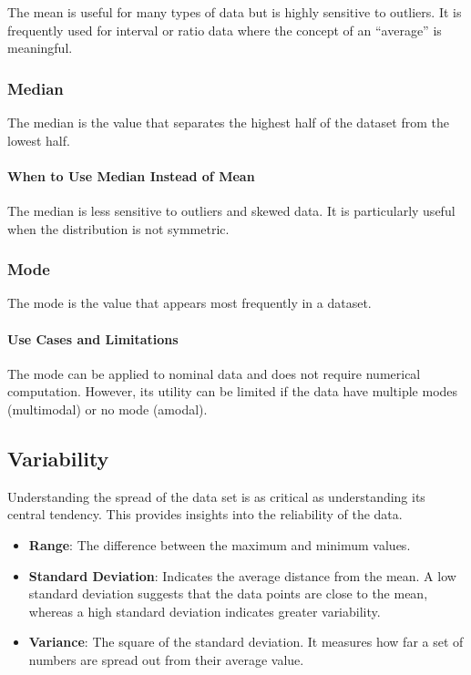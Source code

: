 \documentclass[
  b5paper]{book}
\begin{document}
The mean is useful for many types of data but is highly sensitive to outliers. It is frequently used for interval or ratio data where the concept of an ``average'' is meaningful.

\hypertarget{median}{%
\subsubsection{Median}\label{median}}

The median is the value that separates the highest half of the dataset from the lowest half.

\hypertarget{when-to-use-median-instead-of-mean}{%
\paragraph{When to Use Median Instead of Mean}\label{when-to-use-median-instead-of-mean}}

The median is less sensitive to outliers and skewed data. It is particularly useful when the distribution is not symmetric.

\hypertarget{mode}{%
\subsubsection{Mode}\label{mode}}

The mode is the value that appears most frequently in a dataset.

\hypertarget{use-cases-and-limitations}{%
\paragraph{Use Cases and Limitations}\label{use-cases-and-limitations}}

The mode can be applied to nominal data and does not require numerical computation. However, its utility can be limited if the data have multiple modes (multimodal) or no mode (amodal).

\hypertarget{variability}{%
\subsection{Variability}\label{variability}}

Understanding the spread of the data set is as critical as understanding its central tendency. This provides insights into the reliability of the data.

\begin{itemize}
\item
  \textbf{Range}: The difference between the maximum and minimum values.
\item
  \textbf{Standard Deviation}: Indicates the average distance from the mean. A low standard deviation suggests that the data points are close to the mean, whereas a high standard deviation indicates greater variability.
\item
  \textbf{Variance}: The square of the standard deviation. It measures how far a set of numbers are spread out from their average value.
\end{itemize}
\end{document}
